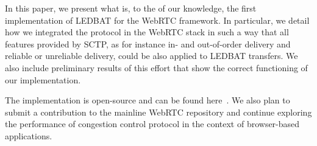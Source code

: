\documentclass{sig-alternate}
\begin{document}
In this paper, we present what is, to the of our knowledge, the first implementation of
LEDBAT for the WebRTC framework. In particular, we detail how we integrated the protocol
in the WebRTC stack in such a way that all features provided by SCTP, as for instance in-
and out-of-order delivery and reliable or unreliable delivery, could be also applied to
LEDBAT transfers. We also include preliminary results of this effort that show the correct
functioning of our implementation.

The implementation is open-source and can be found here~\cite{}. We also plan to submit a
contribution to the mainline WebRTC repository and continue exploring the performance of
congestion control protocol in the context of browser-based applications.










\end{document}
